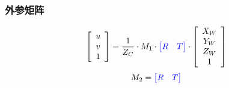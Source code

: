 \documentclass[aspectratio=43]{beamer}
\begin{document}
	\begin{frame}
	\frametitle{外参矩阵}
	\begin{gather*}
\left[ \begin{array}{c}
	u\\
	v\\
	1\\
\end{array} \right] =\frac{1}{Z_C}\cdot M_1\cdot {\color{blue} \left[ \begin{matrix}
		R&		T\\
	\end{matrix} \right] }\cdot \left[ \begin{array}{c}
	X_W\\
	Y_W\\
	Z_W\\
	1\\
\end{array} \right] 
	\end{gather*}
	\begin{gather}
M_2={\color{blue} \left[ \begin{matrix}
		R&		T\\
	\end{matrix} \right] }
	\end{gather}
	\end{frame}
\end{document}
